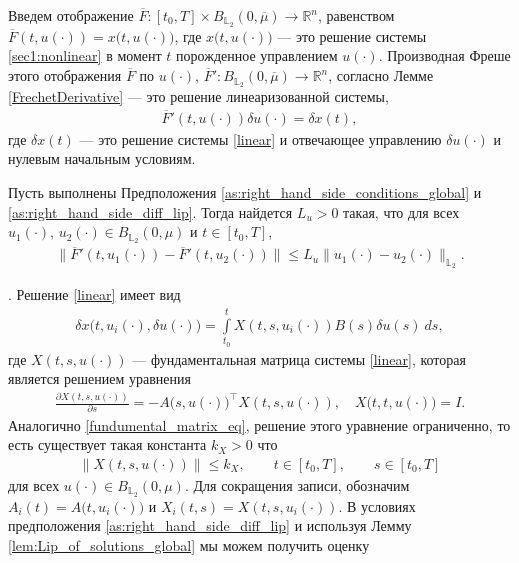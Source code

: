 \documentclass[../main.tex]{subfiles}
\begin{document}
	Введем отображение $\overline{F}: [t_0,T]  \times B_{\mathbb{L}_2}(0,\overline{\mu}) \to \mathbb{R}^n$, равенством $\overline{F}(t, u(\cdot)) = x \big(t, u(\cdot)\big) $, где $x \big(t, u(\cdot)\big)$ --- это решение системы \eqref{sec1:nonlinear} в момент $t$ порожденное управлением $u(\cdot)$.  Производная Фреше этого отображения $\overline{F}$ по $u(\cdot)$, $\overline{F}': B_{\mathbb{L}_2}(0,\overline{\mu}) \to \mathbb{R}^n $, согласно Лемме \ref{FrechetDerivative} --- это решение линеаризованной системы, 
	\begin{gather}\label{dF}
		\overline{F}'(t, u(\cdot)) \delta u(\cdot) = \delta x(t), 
	\end{gather}
	где $\delta x(t)$ --- это решение системы \eqref{linear} и отвечающее управлению $\delta u(\cdot)$ и нулевым начальным условиям.
	\begin{lemma}\label{lem:lip_dx_global}
		Пусть выполнены Предположения \ref{as:right_hand_side_conditions_global} и \ref{as:right_hand_side_diff_lip}.  Тогда найдется  $L_u > 0$ такая, что для всех  $u_1(\cdot),\, u_2(\cdot) \in B_{\mathbb{L}_2}(0,\mu)$ и $t \in [t_0,T]$, 
		\begin{gather*}
			\| \overline{F}'(t, u_1(\cdot)) - \overline{F}'(t, u_2(\cdot)) \| \leqslant L_u \| u_1(\cdot) - u_2(\cdot) \|_{\mathbb{L}_2}.
		\end{gather*}
	\end{lemma}
	\doc. 
	Решение \eqref{linear} имеет вид
	\begin{gather}\label{xu}
		\delta x\big(t, u_i(\cdot),\delta u(\cdot)\big) = \int\limits_{t_0}^{t}  X(t,s,u_i(\cdot)) B(s) \delta u(s) \ ds,
	\end{gather}
	где $X(t,s,u(\cdot)) $ --- фундаментальная матрица системы \eqref{linear}, которая является решением уравнения
	\begin{gather*}
		\frac{\partial X(t, s, u(\cdot))}{\partial s} = -A\big(s,u(\cdot)\big)^{\top} X(t, s, u(\cdot)), \quad X\big(t, t, u(\cdot)\big) = I.
	\end{gather*}
	Аналогично \eqref{fundumental_matrix_eq}, решение этого уравнение ограниченно, то есть существует такая константа $k_X>0$ что
	\begin{gather*}
		\| X(t,s, u(\cdot)) \| \leqslant k_X, \qquad t \in [t_0,T], \qquad s \in [t_0,T]
	\end{gather*}
	для всех $u(\cdot) \in B_{\mathbb{L}_2}(0,\mu)$. Для сокращения записи, обозначим $A_i(t) = A\big(t, u_i(\cdot)\big) $ и $ X_i(t,s) = X(t, s, u_i(\cdot))$. В условиях предположения \ref{as:right_hand_side_diff_lip} и используя Лемму \ref{lem:Lip_of_solutions_global} мы можем получить оценку
\end{document}

